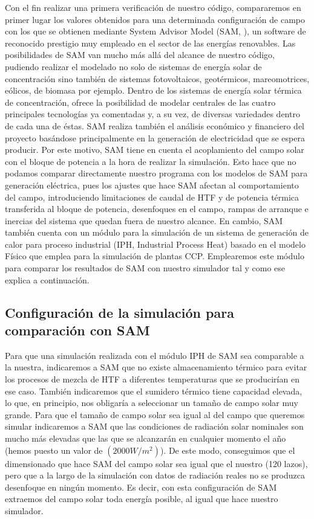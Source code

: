 Con el fin realizar una primera verificación de nuestro código, compararemos en primer lugar los valores obtenidos para una determinada configuración de campo con los que se obtienen mediante System Advisor Model (SAM, \cite{freemanSystemAdvisorModel2018}), un software de reconocido prestigio muy empleado en el sector de las energías renovables. Las posibilidades de SAM van mucho más allá del alcance de nuestro código, pudiendo realizar el modelado no solo de sistemas de energía solar de concentración sino también de sistemas fotovoltaicos, geotérmicos, mareomotrices, eólicos, de biomasa por ejemplo. Dentro de los sistemas de energía solar térmica de concentración, ofrece la posibilidad de modelar centrales de las cuatro principales tecnologías ya comentadas y, a su vez, de diversas variedades dentro de cada una de éstas. SAM realiza también el análisis económico y financiero del proyecto basándose principalmente en la generación de electricidad que se espera producir. Por este motivo, SAM tiene en cuenta el acoplamiento del campo solar con el bloque de potencia a la hora de realizar la simulación.  Esto hace que no podamos comparar directamente nuestro programa con los modelos de SAM para generación eléctrica, pues los ajustes que hace SAM afectan al comportamiento del campo, introduciendo limitaciones de caudal de HTF y de potencia térmica transferida al bloque de potencia, desenfoques en el campo, rampas de arranque e inercias del sistema que quedan fuera de nuestro alcance. En cambio, SAM también cuenta con un módulo para la simulación de un sistema de generación de calor  para proceso industrial (IPH, Industrial Process Heat) basado en el modelo Físico que emplea para la simulación de plantas CCP. Emplearemos este módulo para comparar los resultados de SAM con nuestro simulador tal y como ese explica a continuación.

\subsection{Configuración de la simulación para comparación con SAM}
\label{configuracion-simulaciones}

Para que una simulación realizada con el módulo IPH de SAM sea comparable a la nuestra, indicaremos a SAM que no existe almacenamiento térmico para evitar los procesos de mezcla de HTF a diferentes temperaturas que se producirían en ese caso. También indicaremos que el sumidero térmico tiene capacidad elevada, lo que, en principio, nos obligaría a seleccionar un tamaño de campo solar muy grande. Para que el tamaño de campo solar sea igual al del campo que queremos simular indicaremos a SAM que las condiciones de radiación solar nominales son mucho más elevadas que las que se alcanzarán en cualquier momento el año (hemos puesto un valor de $(2000 W/m^2)$). De este modo, conseguimos que el dimensionado que hace SAM del campo solar sea igual que el nuestro (120 lazos), pero que a la largo de la simulación con datos de radiación reales no se produzca desenfoque en ningún momento. Es decir, con esta configuración de SAM extraemos del campo solar toda energía posible, al igual que hace nuestro simulador.


